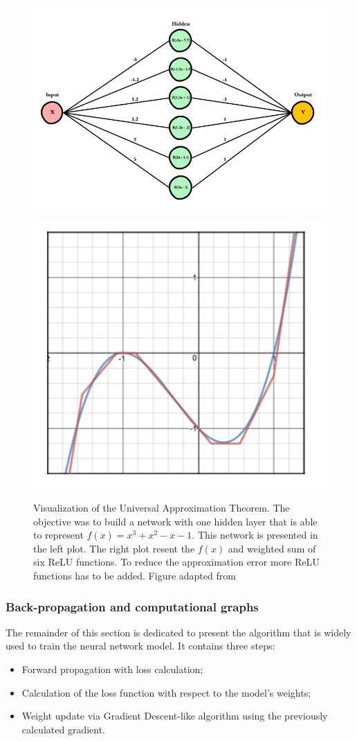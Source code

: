 \begin{figure}[!htb]
 \begin{center}
   \includegraphics[width=0.49\linewidth]{figures/UAT_2.PNG}
    \includegraphics[width=0.49\linewidth]{figures/UAT.PNG}
   \caption[Visualization of the Universal Approximation Theorem]{Visualization of the Universal Approximation Theorem. The objective was to build a network with one hidden layer that is able to represent $f(x)= x^{3}+x^{2}-x-1$. This network is presented in the left plot. The right plot resent the $f(x)$ and weighted sum of six ReLU functions. To reduce the approximation error more ReLU functions has to be added. Figure adapted from \cite{UAT_blog}
     \label{fig:Universal_approx}}
 \end{center}
\end{figure}

\subsubsection{Back-propagation and computational graphs}
The remainder of this section is dedicated to present the algorithm that is widely used to train the neural network model. It contains three steps: 

\begin{itemize}
    \item Forward propagation with loss calculation;
    \item Calculation of the loss function with respect to the model's weights;
    \item Weight update via Gradient Descent-like algorithm using the previously calculated gradient.
\end{itemize}

